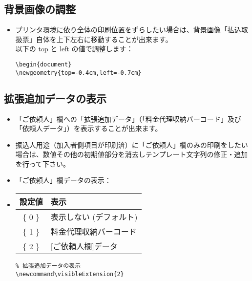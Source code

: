 \documentclass[a4paper,10pt,titlepage]{ltjsarticle}
\def\colH#1{\color[HTML]{#1}}
\newcommand\visibleExtension{0}
\begin{document}
\subsection{背景画像の調整}
\begin{itemize}
  \item プリンタ環境に依り全体の印刷位置をずらしたい場合は、背景画像「払込取扱票」自体を上下左右に移動することが出来ます。\\
以下の {\colH{800000} top} と {\colH{800000} left} の値で調整します：
\begin{verbatim}
\begin{document}
\newgeometry{top=-0.4cm,left=-0.7cm}
\end{verbatim}
  
\end{itemize}

\subsection{拡張追加データの表示}

\begin{itemize}
   \item 「ご依頼人」欄への「拡張追加データ」（「料金代理収納バーコード」及び「依頼人データ」）を表示することが出来ます。   
   \item 振込人用途（加入者側項目が印刷済）に「ご依頼人」欄のみの印刷をしたい場合は、数値その他の初期値部分を消去しテンプレート文字列の修正・追加を行って下さい。
   \item 「ご依頼人」欄データの表示：
   \item[] 
\vspace{2mm}
\begin{tabular}{|c|l|}
\hline
\bfseries{設定値} & \hspace{40pt}\bfseries{表示}\\
\hline
\{ 0 \} & 表示しない (デフォルト)\\
\hline
\{ 1 \} & 料金代理収納バーコード\\
\hline
\{ 2 \} & [ご依頼人欄]データ\\
\hline
\end{tabular}
\vspace{2mm}
              
\begin{verbatim}
% 拡張追加データの表示
\newcommand\visibleExtension{2}
\end{verbatim}

\end{itemize}
\end{document}
